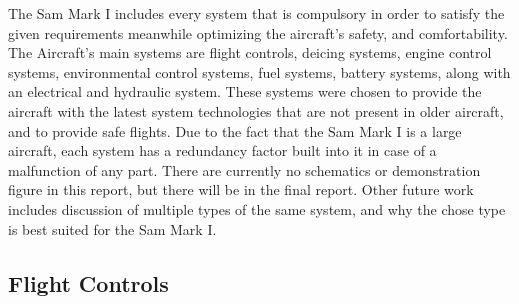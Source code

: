 The Sam Mark I includes every system that is compulsory in order to satisfy the given requirements meanwhile optimizing the aircraft's safety, and comfortability. The Aircraft's main systems are flight controls, deicing systems, engine control systems, environmental control systems, fuel systems, battery systems, along with an electrical and hydraulic system. These systems were chosen to provide the aircraft with the latest system technologies that are not present in older aircraft, and to provide safe flights. Due to the fact that the Sam Mark I is a large aircraft, each system has a redundancy factor built into it in case of a malfunction of any part. There are currently no schematics or demonstration figure in this report, but there will be in the final report. Other future work includes discussion of multiple types of the same system, and why the chose type is best suited for the Sam Mark I. 

\subsection{Flight Controls}
